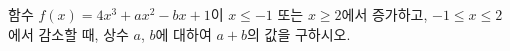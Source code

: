 함수 $f(x)=4x^3+ax^2-bx+1$이 $x\le -1$ 또는 $x\ge 2$에서 증가하고, $-1\le x\le 2$에서 감소할 때, 상수 $a$, $b$에 대하여 $a+b$의 값을 구하시오.
